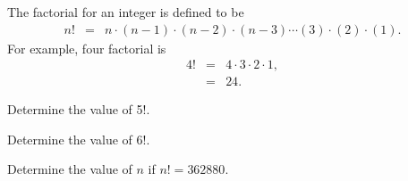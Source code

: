 \begin{problem}
\item The factorial for an integer is defined to be 
  \begin{eqnarray*}
    n! & = & n \cdot (n-1) \cdot (n-2) \cdot (n-3) \cdots (3) \cdot (2) \cdot (1).
  \end{eqnarray*}
  For example, four factorial is 
  \begin{eqnarray*}
    4! & = & 4 \cdot 3 \cdot 2 \cdot 1, \\
       & = & 24.
  \end{eqnarray*}

  \begin{subproblem}
  \item Determine the value of 5!.
    \vfill
  \item Determine the value of 6!.
    \vfill
  \item Determine the value of $n$ if $n!=362880$.
    \vfill
  \end{subproblem}
\end{problem}


